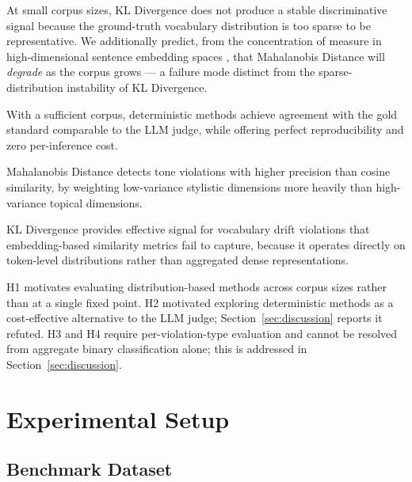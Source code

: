 \documentclass[11pt,a4paper]{article}
\begin{document}
\begin{description}[leftmargin=2em, labelwidth=2em]
  \item[\textbf{H1}] At small corpus sizes, KL Divergence does not produce
        a stable discriminative signal because the ground-truth vocabulary
        distribution is too sparse to be representative. We additionally
        predict, from the concentration of measure in high-dimensional
        sentence embedding spaces \citep{beyer1999nearest}, that Mahalanobis
        Distance will \emph{degrade} as the corpus grows --- a failure mode
        distinct from the sparse-distribution instability of KL Divergence.

  \item[\textbf{H2}] With a sufficient corpus, deterministic methods achieve
        agreement with the gold standard comparable to the LLM judge, while
        offering perfect reproducibility and zero per-inference cost.

  \item[\textbf{H3}] Mahalanobis Distance detects tone violations with higher
        precision than cosine similarity, by weighting low-variance stylistic
        dimensions more heavily than high-variance topical dimensions.

  \item[\textbf{H4}] KL Divergence provides effective signal for vocabulary
        drift violations that embedding-based similarity metrics fail to
        capture, because it operates directly on token-level distributions
        rather than aggregated dense representations.
\end{description}

H1 motivates evaluating distribution-based methods across corpus sizes
rather than at a single fixed point. H2 motivated exploring deterministic
methods as a cost-effective alternative to the LLM judge;
Section~\ref{sec:discussion} reports it refuted. H3 and H4 require
per-violation-type evaluation and cannot be resolved from aggregate binary
classification alone; this is addressed in Section~\ref{sec:discussion}.

\section{Experimental Setup}
\label{sec:setup}

\subsection{Benchmark Dataset}
\end{document}
